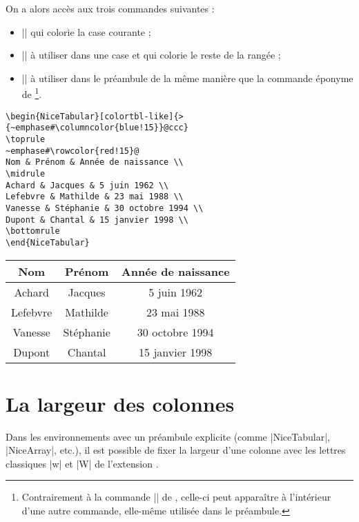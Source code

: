 \documentclass[dvipsnames]{article}%
\begin{document}
On a alors accès aux trois commandes suivantes :
\begin{itemize}
\item |\cellcolor| qui colorie la case courante ;
\item |\rowcolor| à utiliser dans une case et qui colorie le reste de la rangée
;
\item |\columncolor| à utiliser dans le préambule de la même manière que la
commande éponyme de \footnote{Contrairement à la commande
|\columncolor| de , celle-ci peut apparaître à l'intérieur d'une
autre commande, elle-même utilisée dans le préambule.}.
\end{itemize}

\medskip
\begin{Verbatim}
\begin{NiceTabular}[colortbl-like]{>{~emphase#\columncolor{blue!15}}@ccc}
\toprule
~emphase#\rowcolor{red!15}@
Nom & Prénom & Année de naissance \\
\midrule
Achard & Jacques & 5 juin 1962 \\
Lefebvre & Mathilde & 23 mai 1988 \\
Vanesse & Stéphanie & 30 octobre 1994 \\
Dupont & Chantal & 15 janvier 1998 \\
\bottomrule
\end{NiceTabular}
\end{Verbatim}


\begin{center}
\begin{NiceTabular}{>{}ccc}
\toprule
{}
Nom & Prénom & Année de naissance \\
\midrule
Achard & Jacques & 5 juin 1962 \\
Lefebvre & Mathilde & 23 mai 1988 \\
Vanesse & Stéphanie & 30 octobre 1994 \\
Dupont & Chantal & 15 janvier 1998 \\
\bottomrule
\end{NiceTabular}
\end{center}


\section{La largeur des colonnes}
\label{width}

Dans les environnements avec un préambule explicite (comme |{NiceTabular}|,
|{NiceArray}|, etc.), il est possible de fixer la largeur d'une colonne avec les
lettres classiques |w| et |W| de l'extension .
\end{document}
